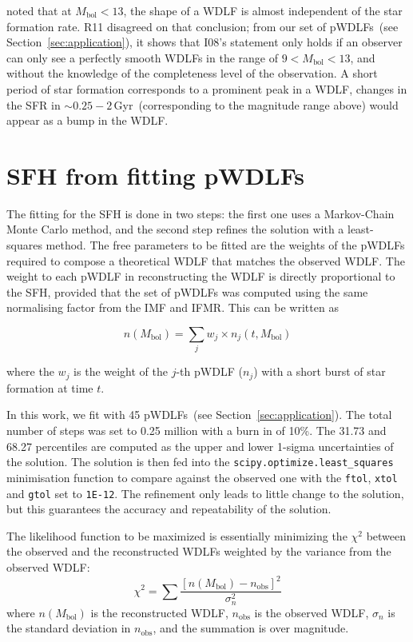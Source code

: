\documentclass[fleqn,usenatbib]{mnras}
\begin{document}
\citet[][hereafter, I08]{2008ApJ...682L.109I} noted that at
$M_{\mathrm{bol}} < 13$, the shape of a WDLF is almost independent of the star
formation rate. R11 disagreed on that conclusion; from our set of pWDLFs~(see
Section~\ref{sec:application}), it shows that I08's statement only holds
if an observer can only see a perfectly smooth WDLFs in the range of 
$9 < M_{\mathrm{bol}} < 13$, and without the knowledge of the completeness level
of the observation. A short period of star formation corresponds to a
prominent peak in a WDLF, changes in the SFR in $\sim$$0.25-2$\,Gyr~(corresponding
to the magnitude range above) would appear as a bump in the WDLF.

\section{SFH from fitting pWDLFs}
\label{sec:fitting}
The fitting for the SFH is done in two steps: the first one uses a Markov-Chain
Monte Carlo method, and the second step refines the solution with a least-squares
method. The free parameters to be fitted are the weights of the pWDLFs required 
to compose a theoretical WDLF that matches the observed WDLF. The weight to
each pWDLF in reconstructing the WDLF is directly proportional to the SFH,
provided that the set of pWDLFs was computed using the same normalising factor
from the IMF and IFMR. This can be written as

\begin{equation}
    n(M_\mathrm{bol}) = \sum_j w_j \times n_j(t, M_\mathrm{bol})    
\end{equation}

where the $w_j$ is the weight of the $j$-th pWDLF ($n_j$) with a short burst of
star formation at time $t$.

In this work, we fit with 45 pWDLFs~(see Section~\ref{sec:application}). The
total number of steps was set to 0.25 million with a burn in of 10\%. The 31.73
and 68.27 percentiles are computed as the upper and lower 1-sigma uncertainties
of the solution. The solution is then fed into the \texttt{scipy.optimize.least\_squares}
minimisation function to compare against the observed one with the \texttt{ftol},
\texttt{xtol} and \texttt{gtol} set to \texttt{1E-12}. The refinement only leads
to little change to the solution, but this guarantees the accuracy and 
repeatability of the solution.

The likelihood function to be maximized is essentially minimizing the $\chi^2$
between the observed and the reconstructed WDLFs weighted by the variance from
the observed WDLF:
\begin{equation}
    \chi^2 = \sum \frac{\left[n(M_\mathrm{bol}) - n_\mathrm{obs}\right]^2}{\sigma_n^2}
\end{equation}
where $n(M_\mathrm{bol})$ is the reconstructed WDLF, $n_\mathrm{obs}$ is the
observed WDLF, $\sigma_n$ is the standard deviation in $n_\mathrm{obs}$, and the
summation is over magnitude.
\end{document}
